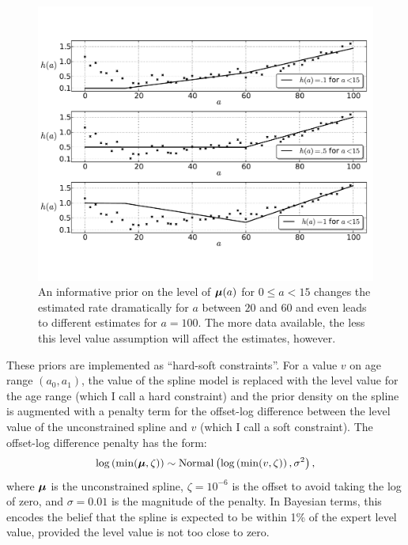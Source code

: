\begin{figure}[h]
\begin{center}
\includegraphics[width=\textwidth]{level_value-smoothing-splines.pdf}
\caption{An informative prior on the level of
$\boldsymbol{\mu}(a)$ for $0 \leq a < 15$ changes the estimated rate dramatically
for $a$ between $20$ and $60$ and even leads to different estimates
for $a = 100$.  The more data available, the less this level value
assumption will affect the estimates, however.
}
\label{level-value-priors}
\end{center}
\end{figure}



These priors are implemented as ``hard-soft constraints''.  For a
value $v$ on age range $(a_0,a_1)$, the value of the spline model is
replaced with the level value for the age range (which I call a hard
constraint) and the prior density on the spline is augmented with a
penalty term for the offset-log difference between the level value of
the unconstrained spline and $v$ (which I call a soft constraint). The
offset-log difference penalty has the form:
\[
\log\left(\min(\boldsymbol{\mu}, \zeta)\right) \sim \operatorname{Normal}\left(\log\left(\min(v, \zeta)\right), \sigma^2\right),
\]
where $\boldsymbol{\mu}$ is the unconstrained spline, $\zeta = 10^{-6}$ is the
offset to avoid taking the log of zero, and $\sigma = 0.01$ is the
magnitude of the penalty.  In Bayesian terms, this encodes the belief
that the spline is expected to be within 1\% of the expert level
value, provided the level value is not too close to zero.

